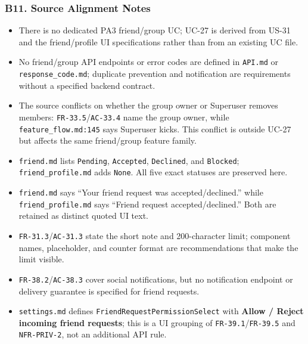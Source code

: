 \documentclass[12pt]{article}
\begin{document}
\hypertarget{sec:b11-source-alignment-notes}{}
\subsubsection*{B11. Source Alignment Notes}
\par\medskip

\begin{itemize}
\item There is no dedicated PA3 friend/group UC; UC-27 is derived from US-31 and the friend/profile UI specifications rather than from an existing UC file.
\item No friend/group API endpoints or error codes are defined in \texttt{API.md} or \texttt{response\_code.md}; duplicate prevention and notification are requirements without a specified backend contract.
\item The source conflicts on whether the group owner or Superuser removes members: \texttt{FR-33.5}/\texttt{AC-33.4} name the group owner, while \texttt{feature\_flow.md:145} says Superuser kicks. This conflict is outside UC-27 but affects the same friend/group feature family.
\item \texttt{friend.md} lists \texttt{Pending}, \texttt{Accepted}, \texttt{Declined}, and \texttt{Blocked}; \texttt{friend\_profile.md} adds \texttt{None}. All five exact statuses are preserved here.
\item \texttt{friend.md} says “Your friend request was accepted/declined.” while \texttt{friend\_profile.md} says “Friend request accepted/declined.” Both are retained as distinct quoted UI text.
\item \texttt{FR-31.3}/\texttt{AC-31.3} state the short note and 200-character limit; component names, placeholder, and counter format are recommendations that make the limit visible.
\item \texttt{FR-38.2}/\texttt{AC-38.3} cover social notifications, but no notification endpoint or delivery guarantee is specified for friend requests.
\item \texttt{settings.md} defines \texttt{FriendRequestPermissionSelect} with \textbf{Allow / Reject incoming friend requests}; this is a UI grouping of \texttt{FR-39.1}/\texttt{FR-39.5} and \texttt{NFR-PRIV-2}, not an additional API rule.
\end{itemize}
\par\medskip

\par\medskip
\hypertarget{sec:ui-prototype-specimens}{}
\end{document}

